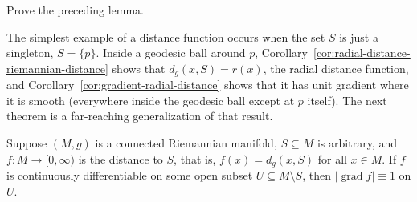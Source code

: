 \begin{exercise}
\label{exer:prove-distance-lemma}

Prove the preceding lemma.
\end{exercise}

The simplest example of a distance function occurs when the set $S$ is just a singleton, $S = \{p\}$. Inside a geodesic ball around $p$, Corollary~\ref{cor:radial-distance-riemannian-distance} shows that $d_g(x, S) = r(x)$, the radial distance function, and Corollary~\ref{cor:gradient-radial-distance} shows that it has unit gradient where it is smooth (everywhere inside the geodesic ball except at $p$ itself). The next theorem is a far-reaching generalization of that result.

\begin{theorem}
\label{thm:distance-to-subset-unit-gradient}

Suppose $(M, g)$ is a connected Riemannian manifold, $S \subseteq M$ is arbitrary, and $f: M \to [0, \infty)$ is the distance to $S$, that is, $f(x) = d_g(x, S)$ for all $x \in M$. If $f$ is continuously differentiable on some open subset $U \subseteq M \setminus S$, then $|\operatorname{grad} f| \equiv 1$ on $U$.
\end{theorem}

